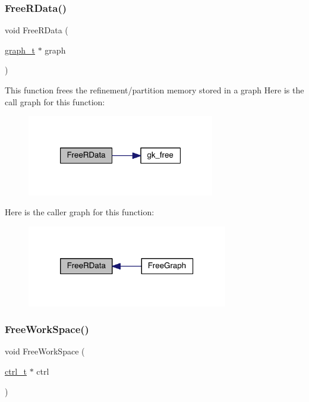 \subsubsection{\texorpdfstring{Free\+R\+Data()}{FreeRData()}}
{\footnotesize\ttfamily void Free\+R\+Data (\begin{DoxyParamCaption}\item[{\hyperlink{a00734}{graph\+\_\+t} $\ast$}]{graph }\end{DoxyParamCaption})}

This function frees the refinement/partition memory stored in a graph Here is the call graph for this function\+:\nopagebreak
\begin{figure}[H]
\begin{center}
\leavevmode
\includegraphics[width=232pt]{a00945_a12a6bda050dc470113f4d1cd5aa5777d_cgraph}
\end{center}
\end{figure}
Here is the caller graph for this function\+:\nopagebreak
\begin{figure}[H]
\begin{center}
\leavevmode
\includegraphics[width=248pt]{a00945_a12a6bda050dc470113f4d1cd5aa5777d_icgraph}
\end{center}
\end{figure}
\mbox{\label{a00945_a0176e7569d59bfac1b0fc2d2fa9ac2f9}} 
\subsubsection{\texorpdfstring{Free\+Work\+Space()}{FreeWorkSpace()}}
{\footnotesize\ttfamily void Free\+Work\+Space (\begin{DoxyParamCaption}\item[{\hyperlink{a00742}{ctrl\+\_\+t} $\ast$}]{ctrl }\end{DoxyParamCaption})}

